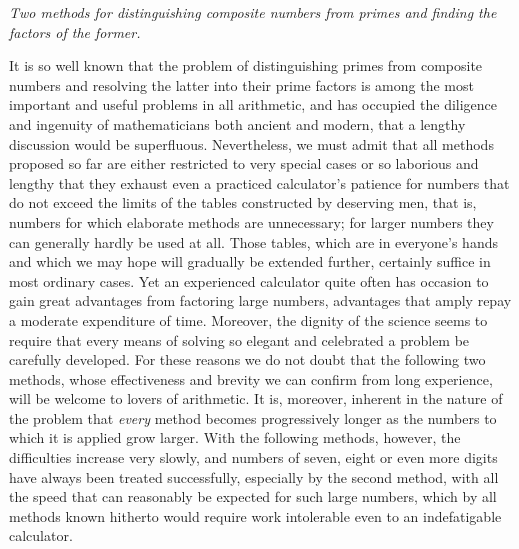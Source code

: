 \begin{center}\textit{Two methods for distinguishing composite numbers from primes and finding the factors of the former.}\end{center}


It is so well known that the problem of distinguishing primes from composite numbers and resolving the latter into their prime factors is among the most important and useful problems in all arithmetic, and has occupied the diligence and ingenuity of mathematicians both ancient and modern, that a lengthy discussion would be superfluous. Nevertheless, we must admit that all methods proposed so far are either restricted to very special cases or so laborious and lengthy that they exhaust even a practiced calculator's patience for numbers that do not exceed the limits of the tables constructed by deserving men, that is, numbers for which elaborate methods are unnecessary; for larger numbers they can generally hardly be used at all. Those tables, which are in everyone's hands and which we may hope will gradually be extended further, certainly suffice in most ordinary cases. Yet an experienced calculator quite often has occasion to gain great advantages from factoring large numbers, advantages that amply repay a moderate expenditure of time. Moreover, the dignity of the science seems to require that every means of solving so elegant and celebrated a problem be carefully developed. For these reasons we do not
doubt that the following two methods, whose effectiveness and brevity we can confirm from long experience, will be welcome to lovers of arithmetic. It is, moreover, inherent in the nature of the problem that \textit{every} method becomes progressively longer as the numbers to which it is applied grow larger. With the following methods, however, the difficulties increase very slowly, and numbers of seven, eight or even more digits have always been treated successfully, especially by the second method, with all the speed that can reasonably be expected for such large numbers, which by all methods known hitherto would require work intolerable even to an indefatigable calculator.

